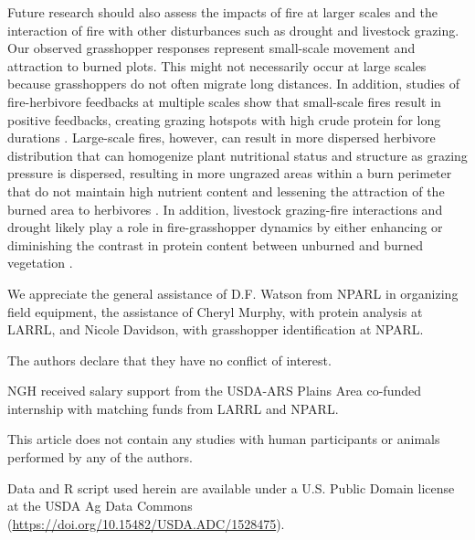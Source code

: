 \documentclass[referee, 
	            sn-basic]
           {sn-jnl}
\begin{document}
\begin{linenumbers}
Future research should also assess the impacts of fire at larger scales and the interaction of fire with other disturbances such as drought and livestock grazing. Our observed grasshopper responses represent small-scale movement and attraction to burned plots. This might not necessarily occur at large scales because grasshoppers do not often migrate long distances. In addition, studies of fire-herbivore feedbacks at multiple scales show that small-scale fires result in positive feedbacks, creating grazing hotspots with high crude protein for long durations \citep{cromsigt2008}. Large-scale fires, however, can result in more dispersed herbivore distribution that can homogenize plant nutritional status and structure as grazing pressure is dispersed, resulting in more ungrazed areas within a burn perimeter that do not maintain high nutrient content \citep{archibald2005} and lessening the attraction of the burned area to herbivores \citep{donaldson2018}. In addition,  livestock grazing-fire interactions \citep{onsager2000a, oneill2003} and drought likely play a role in fire-grasshopper dynamics by either enhancing or diminishing the contrast in protein content between unburned and burned vegetation \citep{augustine2014, yoganand2014, ozment2021}. 



\backmatter



We appreciate the general assistance of D.F. Watson from NPARL in organizing field equipment, the assistance of Cheryl Murphy, with protein analysis at LARRL, and Nicole Davidson, with grasshopper identification at NPARL. 



The authors declare that they have no conflict of interest.


NGH received salary support from the USDA-ARS Plains Area co-funded internship with matching funds from LARRL and NPARL. 


This article does not contain any studies with human participants or animals performed by any of the authors.  


Data and \textsf{R} script used herein are available under a U.S. Public Domain license at the USDA Ag Data Commons (\href{doi.org/10.15482/USDA.ADC/1528475}{https://doi.org/10.15482/USDA.ADC/1528475}). 


\end{linenumbers}
\end{document}
